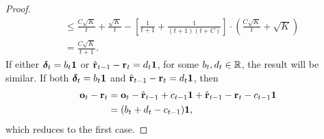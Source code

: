 \begin{proof}
\begin{equation*}
\begin{split}
    &\le \frac{C \sqrt{K}}{t} + \frac{\sqrt{K}}{t} - \left[ \frac{1}{t+1} + \frac{1}{(t+1)(t+C)} \right] \cdot \left( \frac{C \sqrt{K}}{t} + \sqrt{K} \right) \\
    &= \frac{C \sqrt{K}}{t+1}.
\end{split}
\end{equation*}
If either ${\boldsymbol{\delta}}_t = b_t {\mathbf{1}}$ or $\hat{{\mathbf{r}}}_{t-1} - {\mathbf{r}}_t = d_t {\mathbf{1}}$, for some $b_t, d_t \in {\mathbb{R}}$, the result will be similar. If both ${\boldsymbol{\delta}}_t = b_t {\mathbf{1}}$ and $\hat{{\mathbf{r}}}_{t-1} - {\mathbf{r}}_t = d_t {\mathbf{1}}$, then
\begin{equation*}
\begin{split}
    {\mathbf{o}}_t - {\mathbf{r}}_t &= {\mathbf{o}}_{t} - \hat{{\mathbf{r}}}_{t-1} + c_{t-1} {\mathbf{1}} + \hat{{\mathbf{r}}}_{t-1} - {\mathbf{r}}_t - c_{t-1} {\mathbf{1}} \\
    &= (b_t + d_t - c_{t-1}) {\mathbf{1}},
\end{split}
\end{equation*}
which reduces to the first case.
\end{proof}

